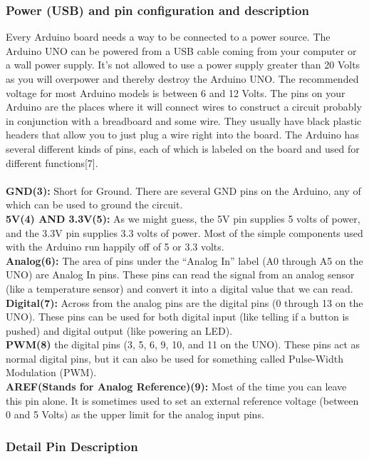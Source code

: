 \documentclass[12pt,a4paper]{article}
\begin{document}
\begin{center}
\begin{center}
\subsubsection*{Power (USB) and pin configuration and description}
Every Arduino board needs a way to be connected to a power source. The Arduino UNO can be powered from a USB cable coming from your computer or a wall power supply. It’s not allowed to use a power supply greater than 20 Volts as you will overpower and thereby destroy the Arduino UNO. The recommended voltage for most Arduino models is between 6 and 12 Volts. The pins on your Arduino are the places where it will connect wires to construct a circuit probably in conjunction with a breadboard and some wire. They usually have black plastic headers that allow you to just plug a wire right into the board. The Arduino has several different kinds of pins, each of which is labeled on the board and used for different functions[7].\\
\\
\textbf{GND(3):} Short for Ground. There are several GND pins on the Arduino, any of which can be used to ground the circuit.\\
\textbf{5V(4) AND 3.3V(5):} As we might guess, the 5V pin supplies 5 volts of power, and the 3.3V pin supplies 3.3 volts of power. Most of the simple components used with the Arduino run happily off of 5 or 3.3 volts.\\
\textbf{Analog(6):} The area of pins under the “Analog In” label (A0 through A5 on the UNO) are Analog In pins. These pins can read the signal from an analog sensor (like a temperature sensor) and convert it into a digital value that we can read.\\
\textbf{Digital(7):} Across from the analog pins are the digital pins (0 through 13 on the UNO). These pins can be used for both digital input (like telling if a button is pushed) and digital output (like powering an LED).\\
\textbf{PWM(8)} the digital pins (3, 5, 6, 9, 10, and 11 on the UNO). These pins act as normal digital pins, but it can also be used for something called Pulse-Width Modulation (PWM).\\
\textbf{AREF(Stands for Analog Reference)(9):} Most of the time you can leave this pin alone. It is sometimes used to set an external reference voltage (between 0 and 5 Volts) as the upper limit for the analog input pins.\\

\subsubsection*{Detail Pin Description}


\end{center}
\end{center}
\end{document}
